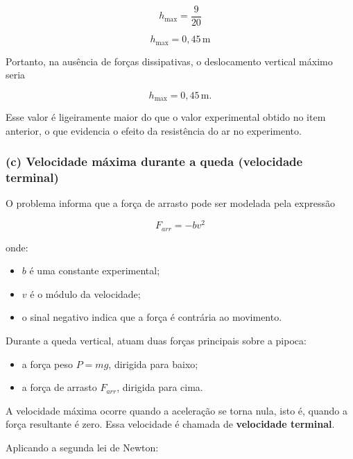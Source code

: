 \documentclass[a4paper,12pt]{article}
\begin{document}
\begin{equation}
h_{\max} = \frac{9}{20}
\end{equation}

\begin{equation}
h_{\max} = 0{,}45\,\text{m}
\end{equation}

Portanto, na ausência de forças dissipativas, o deslocamento vertical máximo seria

\begin{equation}
h_{\max} = 0{,}45\,\text{m}.
\end{equation}

Esse valor é ligeiramente maior do que o valor experimental obtido no item anterior, o que evidencia o efeito da resistência do ar no experimento.

\subsubsection*{(c) Velocidade máxima durante a queda (velocidade terminal)}

O problema informa que a força de arrasto pode ser modelada pela expressão

\begin{equation}
F_{arr} = -b v^2
\end{equation}

onde:

\begin{itemize}
\item \(b\) é uma constante experimental;
\item \(v\) é o módulo da velocidade;
\item o sinal negativo indica que a força é contrária ao movimento.
\end{itemize}

Durante a queda vertical, atuam duas forças principais sobre a pipoca:

\begin{itemize}
\item a força peso \(P = mg\), dirigida para baixo;
\item a força de arrasto \(F_{arr}\), dirigida para cima.
\end{itemize}

A velocidade máxima ocorre quando a aceleração se torna nula, isto é, quando a força resultante é zero. Essa velocidade é chamada de \textbf{velocidade terminal}.

Aplicando a segunda lei de Newton:
\end{document}
